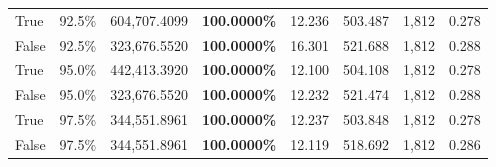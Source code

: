 \begin{table}[H]
\begin{tabular}{lllrllll}
\cline{1-8}
True & 92.5\% & 604,707.4099 & \bfseries \color{red} 100.0000\% & 12.236 & 503.487 & 1,812 & 0.278 \\
\cline{1-8}
False & 92.5\% & 323,676.5520 & \bfseries \color{red} 100.0000\% & 16.301 & 521.688 & 1,812 & 0.288 \\
\cline{1-8}
True & 95.0\% & 442,413.3920 & \bfseries \color{red} 100.0000\% & 12.100 & 504.108 & 1,812 & 0.278 \\
\cline{1-8}
False & 95.0\% & 323,676.5520 & \bfseries \color{red} 100.0000\% & 12.232 & 521.474 & 1,812 & 0.288 \\
\cline{1-8}
True & 97.5\% & 344,551.8961 & \bfseries \color{red} 100.0000\% & 12.237 & 503.848 & 1,812 & 0.278 \\
\cline{1-8}
False & 97.5\% & 344,551.8961 & \bfseries \color{red} 100.0000\% & 12.119 & 518.692 & 1,812 & 0.286 \\
\cline{1-8}
\bottomrule
\end{tabular}
\end{table}
